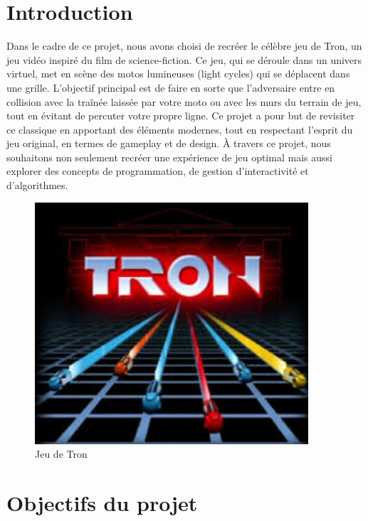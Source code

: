 \documentclass[a4paper,12pt]{article}
\begin{document}
\newpage
\tableofcontents
\newpage


\section{Introduction}
Dans le cadre de ce projet, nous avons choisi de recréer le célèbre jeu de Tron, un jeu vidéo inspiré du film de science-fiction. Ce jeu, qui se déroule dans un univers virtuel, met en scène des motos lumineuses (light cycles) qui se déplacent dans une grille. L'objectif principal est de faire en sorte que l'adversaire entre en collision avec la traînée laissée par votre moto ou avec les murs du terrain de jeu, tout en évitant de percuter votre propre ligne. Ce projet a pour but de revisiter ce classique en apportant des éléments modernes, tout en respectant l'esprit du jeu original, en termes de gameplay et de design. À travers ce projet, nous souhaitons non seulement recréer une expérience de jeu optimal mais aussi explorer des concepts de programmation, de gestion d'interactivité et d'algorithmes.

\vspace{2cm}
\begin{figure}[h]
    \centering
    \includegraphics[height=90mm]{tron.jpeg}
    \caption{Jeu de Tron}
    \label{fig:tron}
\end{figure}

\newpage

\section{Objectifs du projet}
\end{document}
